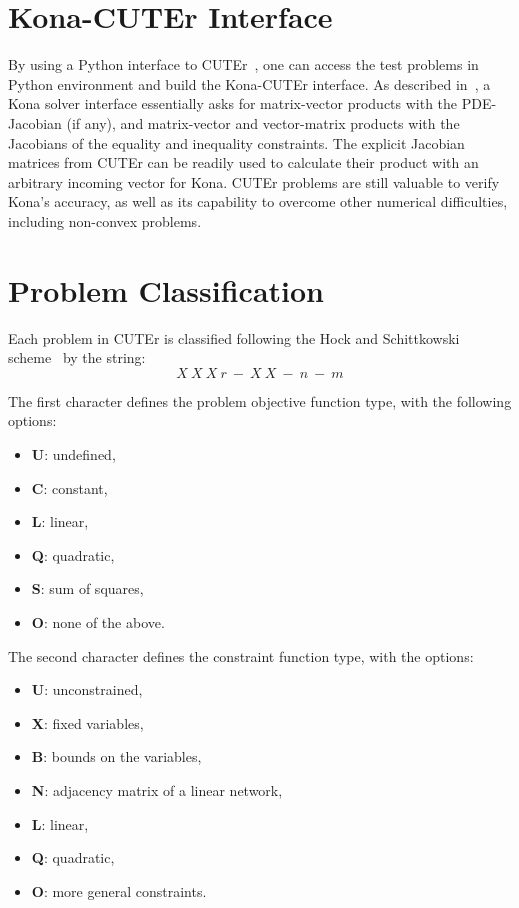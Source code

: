 \section{Kona-CUTEr Interface}\label{sec:konacut}
By using a Python interface to CUTEr~\cite{cuter_python}, one can access the test problems in Python environment and build the Kona-CUTEr interface. As described in~\cite{dener:scitech2016}, a Kona solver interface essentially asks for matrix-vector products with the PDE-Jacobian (if any),  
 and matrix-vector and vector-matrix products with the Jacobians of the equality and inequality constraints. 
The explicit Jacobian matrices from CUTEr can be readily used to calculate their product with an arbitrary incoming vector for Kona.  CUTEr problems are still valuable to verify Kona's accuracy, as well as its capability to overcome other numerical difficulties, including non-convex problems. 



\section{Problem Classification}\label{sec:cuter_clas}
Each problem in CUTEr is classified following the Hock and Schittkowski scheme~\cite{cuterScheme} by the string: 
\begin{equation*}
X \ X \ X \ r \ - \ X \ X \ - \ n \ - \ m
\end{equation*}

The first character defines the problem objective function type, with the following options: 
\begin{itemize}  \itemsep -8pt 
\item \textbf{U}: undefined,
\item  \textbf{C}: constant, 
\item \textbf{L}: linear, 
\item \textbf{Q}: quadratic, 
\item  \textbf{S}: sum of squares, 
\item  \textbf{O}: none of the above. 
\end{itemize}

The second character defines the constraint function type, with the options: 
\begin{itemize}  \itemsep -8pt 
\item  \textbf{U}: unconstrained,
\item  \textbf{X}: fixed variables, 
\item  \textbf{B}: bounds on the variables,
\item  \textbf{N}: adjacency matrix of a linear network,
\item  \textbf{L}: linear, 
\item  \textbf{Q}: quadratic,
\item  \textbf{O}: more general constraints. 
\end{itemize}

